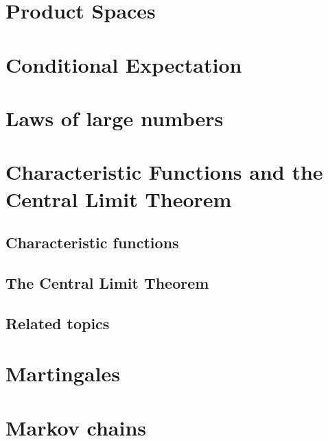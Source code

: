 
\section{Product Spaces}

\section{Conditional Expectation}

\section{Laws of large numbers}

\section{Characteristic Functions and the Central Limit Theorem}

\subsection{Characteristic functions}

\subsection{The Central Limit Theorem}

\subsection{Related topics}



\section{Martingales}

\section{Markov chains}

